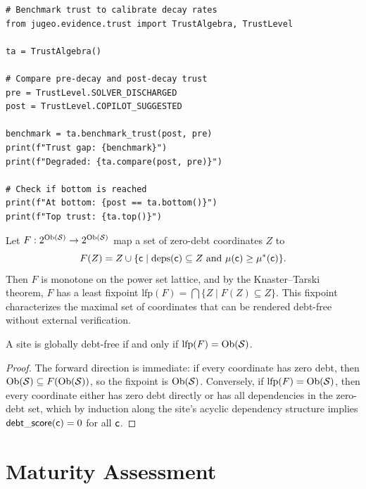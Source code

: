 \documentclass[11pt]{article}
\newcommand{\DebtScore}{\mathsf{debt\_score}}
\begin{document}
\begin{lstlisting}[style=jugeo-python]
# Benchmark trust to calibrate decay rates
from jugeo.evidence.trust import TrustAlgebra, TrustLevel

ta = TrustAlgebra()

# Compare pre-decay and post-decay trust
pre = TrustLevel.SOLVER_DISCHARGED
post = TrustLevel.COPILOT_SUGGESTED

benchmark = ta.benchmark_trust(post, pre)
print(f"Trust gap: {benchmark}")
print(f"Degraded: {ta.compare(post, pre)}")

# Check if bottom is reached
print(f"At bottom: {post == ta.bottom()}")
print(f"Top trust: {ta.top()}")
\end{lstlisting}

\begin{definition}%
\label{def:fixpoint}
Let $F : 2^{\mathrm{Ob}(\mathcal{S})} \to 2^{\mathrm{Ob}(\mathcal{S})}$ map a set of zero-debt
coordinates $Z$ to
\[
  F(Z) = Z \cup \{\mathsf{c} \mid \mathrm{deps}(\mathsf{c}) \subseteq Z
  \text{ and } \mu(\mathsf{c}) \geq \mu^*(\mathsf{c})\}.
\]
Then $F$ is monotone on the power set lattice, and by the
Knaster--Tarski theorem, $F$ has a least fixpoint
$\mathrm{lfp}(F) = \bigcap \{Z \mid F(Z) \subseteq Z\}$.
This fixpoint characterizes the maximal set of coordinates that can
be rendered debt-free without external verification.
\end{definition}

\begin{theorem}\label{thm:fixpoint}
A site is globally debt-free if and only if
$\mathrm{lfp}(F) = \mathrm{Ob}(\mathcal{S})$.
\end{theorem}

\begin{proof}
The forward direction is immediate: if every coordinate has zero
debt, then $\mathrm{Ob}(\mathcal{S}) \subseteq F(\mathrm{Ob}(\mathcal{S}))$, so the fixpoint
is $\mathrm{Ob}(\mathcal{S})$.  Conversely, if $\mathrm{lfp}(F) = \mathrm{Ob}(\mathcal{S})$,
then every coordinate either has zero debt directly or has all
dependencies in the zero-debt set, which by induction along the
site's acyclic dependency structure implies $\DebtScore(\coord)=0$
for all $\mathsf{c}$.
\end{proof}


\section{Maturity Assessment}\label{sec:maturity}
\end{document}
